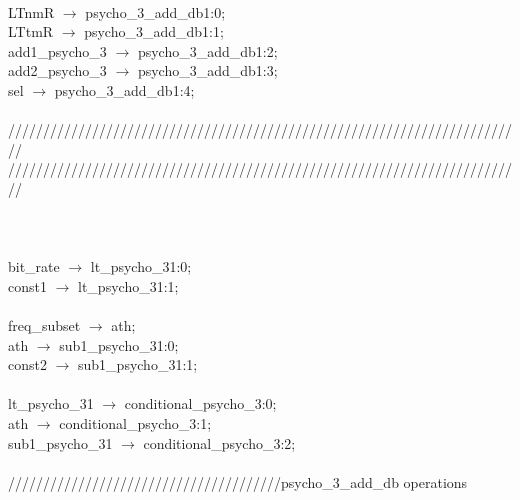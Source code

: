 {   \\
   \hspace*{2em}LTnmR $\rightarrow$ psycho\_3\_add\_db1:0; \\
   \hspace*{2em}LTtmR $\rightarrow$ psycho\_3\_add\_db1:1; \\
   \hspace*{2em}add1\_psycho\_3 $\rightarrow$ psycho\_3\_add\_db1:2; \\
   \hspace*{2em}add2\_psycho\_3 $\rightarrow$ psycho\_3\_add\_db1:3; \\
   \hspace*{2em}sel $\rightarrow$ psycho\_3\_add\_db1:4; \\
   \\
   \hspace*{2em}////////////////////////////////////////////////////////////////////////// \\
   \hspace*{2em}////////////////////////////////////////////////////////////////////////// \\
   \\
   \\
   \\
   \hspace*{2em}bit\_rate $\rightarrow$ lt\_psycho\_31:0; \\
   \hspace*{2em}const1 $\rightarrow$ lt\_psycho\_31:1; \\
   \\
   \hspace*{2em}freq\_subset $\rightarrow$ ath; \\
   \hspace*{2em}ath $\rightarrow$ sub1\_psycho\_31:0; \\
   \hspace*{2em}const2 $\rightarrow$ sub1\_psycho\_31:1; \\
   \\
   \hspace*{2em}lt\_psycho\_31 $\rightarrow$ conditional\_psycho\_3:0; \\
   \hspace*{2em}ath $\rightarrow$ conditional\_psycho\_3:1; \\
   \hspace*{2em}sub1\_psycho\_31 $\rightarrow$ conditional\_psycho\_3:2;  \\
   \\
   \hspace*{2em}///////////////////////////////////////psycho\_3\_add\_db operations \\
}
